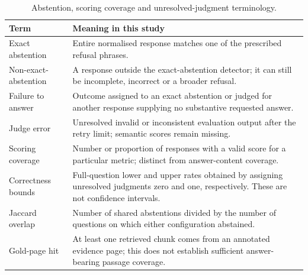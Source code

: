 \begin{table}[H]
\centering
\caption{Abstention, scoring coverage and unresolved-judgment terminology.}
\label{tab:abstention-terminology}
{\small
\renewcommand{\arraystretch}{1.08}
\begin{tabular}{|p{}|p{}|}
\hline
\textbf{Term} & \textbf{Meaning in this study} \\
\hline
Exact abstention & Entire normalised response matches one of the prescribed refusal phrases. \\
Non-exact-abstention & A response outside the exact-abstention detector; it can still be incomplete, incorrect or a broader refusal. \\
Failure to answer & Outcome assigned to an exact abstention or judged for another response supplying no substantive requested answer. \\
Judge error & Unresolved invalid or inconsistent evaluation output after the retry limit; semantic scores remain missing. \\
Scoring coverage & Number or proportion of responses with a valid score for a particular metric; distinct from answer-content coverage. \\
Correctness bounds & Full-question lower and upper rates obtained by assigning unresolved judgments zero and one, respectively. These are not confidence intervals. \\
Jaccard overlap & Number of shared abstentions divided by the number of questions on which either configuration abstained. \\
Gold-page hit & At least one retrieved chunk comes from an annotated evidence page; this does not establish sufficient answer-bearing passage coverage. \\
\hline
\end{tabular}%
}
\end{table}

